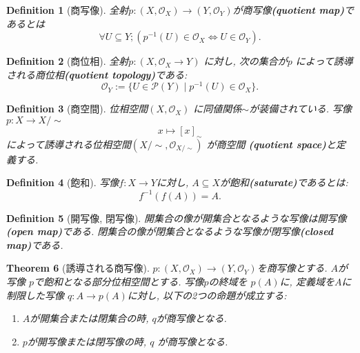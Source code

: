 \documentclass[lualatex]{ltjsbook}
\newtheorem{theorem}{Theorem}[chapter]
\newtheorem{definition}[theorem]{Definition}
\theoremstyle{remark}
\theoremstyle{plain}
\begin{document}
\begin{definition}[商写像]
	全射$p: \left( X,  \mathcal{O}_X \right) \to \left( Y,  \mathcal{O}_Y \right)  $が商写像\textbf{(quotient map)}であるとは
	\[
	\forall U \subseteq Y;\left( p^{-1}\left( U \right) \in \mathcal{O}_X \iff U \in \mathcal{O}_Y \right) 
	.\] 
\end{definition}

\begin{definition}[商位相]
	全射$p:\left( X, \mathcal{O}_X \to Y \right) $ に対し,  次の集合が$p$ によって誘導される商位相\textbf{(quotient topology)}である:
	\[
	\mathcal{O}_Y := \{U \in \mathcal{P}\left( Y \right)  \mid p^{-1}\left( U \right)  \in \mathcal{O}_X \} 
	.\] 
	
\end{definition}

\begin{definition}[商空間]
	位相空間$\left( X,  \mathcal{O}_X \right) $ に同値関係$\sim$が装備されている. 
	 写像$p: X \to X / \sim $
      $$
	x \mapsto [x]_{\sim}
      $$
      によって誘導される位相空間$\left( X / \sim ,  \mathcal{O}_{X / \sim} \right) $ が商空間 \textbf{(quotient space)}と定義する.
\end{definition}

\begin{definition}[飽和]
	写像$f:X \to Y$に対し,  $A \subseteq X$が飽和\textbf{(saturate)}であるとは:
	\[
	f^{-1}\left(f( A) \right) = A
	.\] 
\end{definition}

\begin{definition}[開写像,  閉写像]
開集合の像が開集合となるような写像は開写像\textbf{(open map)}である. 閉集合の像が閉集合となるような写像が閉写像\textbf{(closed map)}である.	
\end{definition}

\begin{theorem}[誘導される商写像]
	$p: (X, \mathcal{O}_X) \to \left( Y, \mathcal{O}_Y \right) $を商写像とする. $A$が写像 $p$で飽和となる部分位相空間とする.  写像$p$の終域を $p(A)$に,  定義域を$A$に制限した写像 $q: A \to p(A)$に対し,  以下の2つの命題が成立する:
	\begin{enumerate}
		\item $A$が開集合または閉集合の時,   $q$が商写像となる.
		\item  $p$が開写像または閉写像の時,   $q$ が商写像となる.
	\end{enumerate}
\end{theorem}
\end{document}
